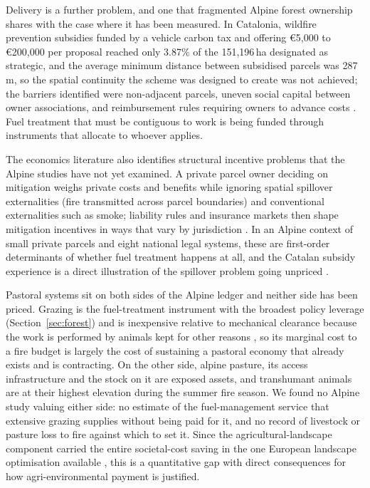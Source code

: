 \documentclass[11pt,a4paper]{article}
\begin{document}
Delivery is a further problem, and one that fragmented Alpine forest ownership shares with the case where it has been measured. In Catalonia, wildfire prevention subsidies funded by a vehicle carbon tax and offering €5{,}000 to €200{,}000 per proposal reached only 3.87\% of the 151{,}196\,ha designated as strategic, and the average minimum distance between subsidised parcels was 287\,m, so the spatial continuity the scheme was designed to create was not achieved; the barriers identified were non-adjacent parcels, uneven social capital between owner associations, and reimbursement rules requiring owners to advance costs \citep{gorrizmifsud_current_2026}. Fuel treatment that must be contiguous to work is being funded through instruments that allocate to whoever applies.

The economics literature also identifies structural incentive problems that the Alpine studies have not yet examined. A private parcel owner deciding on mitigation weighs private costs and benefits while ignoring spatial spillover externalities (fire transmitted across parcel boundaries) and conventional externalities such as smoke; liability rules and insurance markets then shape mitigation incentives in ways that vary by jurisdiction \citep{bayham_economics_2022}. In an Alpine context of small private parcels and eight national legal systems, these are first-order determinants of whether fuel treatment happens at all, and the Catalan subsidy experience is a direct illustration of the spillover problem going unpriced \citep{gorrizmifsud_current_2026}.

Pastoral systems sit on both sides of the Alpine ledger and neither side has been priced. Grazing is the fuel-treatment instrument with the broadest policy leverage (Section~\ref{sec:forest}) and is inexpensive relative to mechanical clearance because the work is performed by animals kept for other reasons \citep{xu_how_2026}, so its marginal cost to a fire budget is largely the cost of sustaining a pastoral economy that already exists and is contracting. On the other side, alpine pasture, its access infrastructure and the stock on it are exposed assets, and transhumant animals are at their highest elevation during the summer fire season. We found no Alpine study valuing either side: no estimate of the fuel-management service that extensive grazing supplies without being paid for it, and no record of livestock or pasture loss to fire against which to set it. Since the agricultural-landscape component carried the entire societal-cost saving in the one European landscape optimisation available \citep{lecinadiaz_incorporating_2023}, this is a quantitative gap with direct consequences for how agri-environmental payment is justified.
\end{document}
